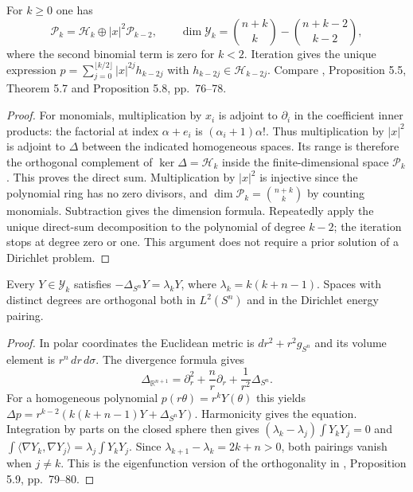 \begin{lemma}\label{lem:harmonic-polynomial-fischer-decomposition}
For $k\geq0$ one has
\[
 \mathcal P_k=\mathcal H_k\mathbin{\oplus}|x|^2\mathcal P_{k-2},
 \qquad
 \dim\mathcal Y_k=\binom{n+k}{k}-\binom{n+k-2}{k-2},
\]
where the second binomial term is zero for $k<2$. Iteration gives the unique expression $p=\sum_{j=0}^{\lfloor k/2\rfloor}|x|^{2j}h_{k-2j}$ with $h_{k-2j}\in\mathcal H_{k-2j}$. Compare \cite{ABR01}, Proposition 5.5, Theorem 5.7 and Proposition 5.8, pp.~76--78.
\end{lemma}
\begin{proof}
For monomials, multiplication by $x_i$ is adjoint to $\partial_i$ in the coefficient inner products: the factorial at index $\alpha+e_i$ is $(\alpha_i+1)\alpha!$. Thus multiplication by $|x|^2$ is adjoint to $\Delta$ between the indicated homogeneous spaces. Its range is therefore the orthogonal complement of $\ker\Delta=\mathcal H_k$ inside the finite-dimensional space $\mathcal P_k$. This proves the direct sum. Multiplication by $|x|^2$ is injective since the polynomial ring has no zero divisors, and $\dim\mathcal P_k=\binom{n+k}{k}$ by counting monomials. Subtraction gives the dimension formula. Repeatedly apply the unique direct-sum decomposition to the polynomial of degree $k-2$; the iteration stops at degree zero or one. This argument does not require a prior solution of a Dirichlet problem.
\end{proof}

\begin{proposition}\label{prop:harmonic-restriction-eigenvalues}
Every $Y\in\mathcal Y_k$ satisfies $-\Delta_{S^n}Y=\lambda_kY$, where $\lambda_k=k(k+n-1)$. Spaces with distinct degrees are orthogonal both in $L^2(S^n)$ and in the Dirichlet energy pairing.
\end{proposition}
\begin{proof}
In polar coordinates the Euclidean metric is $dr^2+r^2g_{S^n}$ and its volume element is $r^n\,dr\,d\sigma$. The divergence formula gives
\[
 \Delta_{\mathbb R^{n+1}}=\partial_r^2+\frac nr\partial_r+\frac1{r^2}\Delta_{S^n}.
\]
For a homogeneous polynomial $p(r\theta)=r^kY(\theta)$ this yields
$\Delta p=r^{k-2}(k(k+n-1)Y+\Delta_{S^n}Y)$. Harmonicity gives the equation. Integration by parts on the closed sphere then gives
$(\lambda_k-\lambda_j)\int Y_kY_j=0$ and $\int\langle\nabla Y_k,\nabla Y_j\rangle=\lambda_j\int Y_kY_j$. Since $\lambda_{k+1}-\lambda_k=2k+n>0$, both pairings vanish when $j\ne k$. This is the eigenfunction version of the orthogonality in \cite{ABR01}, Proposition 5.9, pp.~79--80.
\end{proof}

